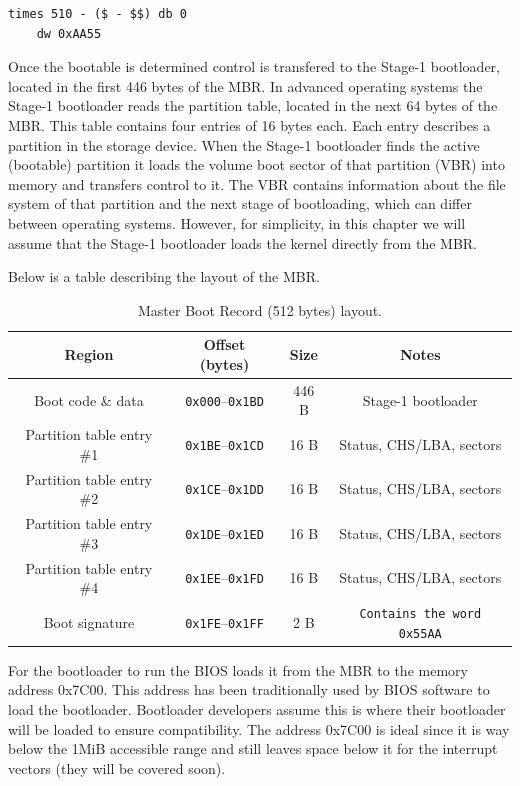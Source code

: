 \begin{lstlisting}[caption={MBR Signature}]
    times 510 - ($ - $$) db 0
    dw 0xAA55
\end{lstlisting}

Once the bootable is determined control is transfered to the Stage-1 bootloader, located in the first 446 bytes of the MBR.
In advanced operating systems the Stage-1 bootloader reads the partition table, located in the next 64 bytes of the MBR.
This table contains four entries of 16 bytes each. Each entry describes a partition in the storage device. When the Stage-1
bootloader finds the active (bootable) partition it loads the volume boot sector of that partition (VBR) into memory and transfers
control to it. The VBR contains information about the file system of that partition and the next stage of bootloading, which can differ
between operating systems. However, for simplicity, in this chapter we will assume that the Stage-1 bootloader loads the kernel directly 
from the MBR.

Below is a table describing the layout of the MBR.

\begin{table}[h]
    \centering
    \renewcommand{\arraystretch}{1.15}
    \begin{tabular}{|c|c|c|c|}
    \hline
    \textbf{Region} & \textbf{Offset (bytes)} & \textbf{Size} & \textbf{Notes} \\
    \hline
    Boot code \& data & \texttt{0x000}–\texttt{0x1BD} & 446 B & Stage-1 bootloader \\
    \hline
    Partition table entry \#1 & \texttt{0x1BE}–\texttt{0x1CD} & 16 B & Status, CHS/LBA, sectors \\
    \hline
    Partition table entry \#2 & \texttt{0x1CE}–\texttt{0x1DD} & 16 B & Status, CHS/LBA, sectors \\
    \hline
    Partition table entry \#3 & \texttt{0x1DE}–\texttt{0x1ED} & 16 B & Status, CHS/LBA, sectors \\
    \hline
    Partition table entry \#4 & \texttt{0x1EE}–\texttt{0x1FD} & 16 B & Status, CHS/LBA, sectors \\
    \hline
    Boot signature & \texttt{0x1FE}–\texttt{0x1FF} & 2 B & \texttt{Contains the word 0x55AA} \\
    \hline
    \end{tabular}
    \caption{Master Boot Record (512 bytes) layout.}
\end{table}
    
For the bootloader to run the BIOS loads it from the MBR to the memory address 0x7C00. This address has been
traditionally used by BIOS software to load the bootloader. Bootloader developers assume this is where their 
bootloader will be loaded to ensure compatibility. The address 0x7C00 is ideal since it is way below the 1MiB 
accessible range and still leaves space below it for the interrupt vectors (they will be covered soon).

